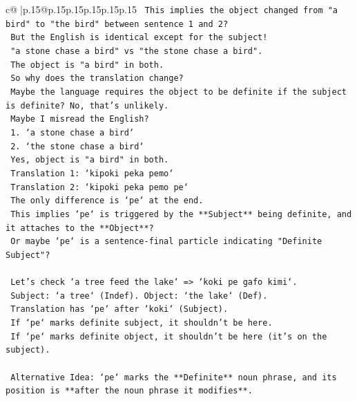 \documentclass{article}
\begin{document}
{\begin{supertabular}{c@{$\;$}|p{.15\linewidth}@{}p{.15\linewidth}p{.15\linewidth}p{.15\linewidth}p{.15\linewidth}p{.15\linewidth}}
{{{\texttt{                    This implies the object changed from "a bird" to "the bird" between sentence 1 and 2?} \\
\texttt{                    But the English is identical except for the subject!} \\
\texttt{                    "a stone chase a bird" vs "the stone chase a bird".} \\
\texttt{                    The object is "a bird" in both.} \\
\texttt{                    So why does the translation change?} \\
\texttt{                    Maybe the language requires the object to be definite if the subject is definite? No, that's unlikely.} \\
\texttt{                    Maybe I misread the English?} \\
\texttt{                    1. `a stone chase a bird`} \\
\texttt{                    2. `the stone chase a bird`} \\
\texttt{                    Yes, object is "a bird" in both.} \\
\texttt{                    Translation 1: `kipoki peka pemo`} \\
\texttt{                    Translation 2: `kipoki peka pemo pe`} \\
\texttt{                    The only difference is `pe` at the end.} \\
\texttt{                    This implies `pe` is triggered by the **Subject** being definite, and it attaches to the **Object**?} \\
\texttt{                    Or maybe `pe` is a sentence{-}final particle indicating "Definite Subject"?} \\
\\ 
\texttt{                    Let's check `a tree feed the lake` => `koki pe gafo kimi`.} \\
\texttt{                    Subject: `a tree` (Indef). Object: `the lake` (Def).} \\
\texttt{                    Translation has `pe` after `koki` (Subject).} \\
\texttt{                    If `pe` marks definite subject, it shouldn't be here.} \\
\texttt{                    If `pe` marks definite object, it shouldn't be here (it's on the subject).} \\
\\ 
\texttt{                    Alternative Idea: `pe` marks the **Definite** noun phrase, and its position is **after the noun phrase it modifies**.} \\
}}}
\end{supertabular}}
\end{document}
